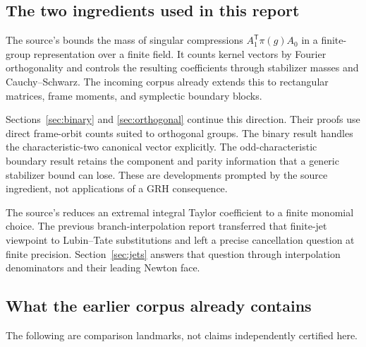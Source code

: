 \subsection{The two ingredients used in this report}

The source's
 bounds the mass of singular compressions
$A_1^{\mathsf T}\pi(g)A_0$ in a finite-group representation over a finite field. It counts kernel vectors by Fourier orthogonality and controls the resulting coefficients through stabilizer masses and Cauchy--Schwarz. The incoming corpus already extends this to rectangular matrices, frame moments, and symplectic boundary blocks.\cite{positivetype,priorrank,priorsymplectic}

Sections~\ref{sec:binary} and \ref{sec:orthogonal} continue this direction. Their proofs use direct frame-orbit counts suited to orthogonal groups. The binary result handles the characteristic-two canonical vector explicitly. The odd-characteristic boundary result retains the component and parity information that a generic stabilizer bound can lose. These are developments prompted by the source ingredient, not applications of a GRH consequence.

The source's
 reduces an extremal integral Taylor coefficient to a finite monomial choice. The previous branch-interpolation report transferred that finite-jet viewpoint to Lubin--Tate substitutions and left a precise cancellation question at finite precision. Section~\ref{sec:jets} answers that question through interpolation denominators and their leading Newton face.\cite{onecurve,priorjets}

\subsection{What the earlier corpus already contains}

The following are comparison landmarks, not claims independently certified here.

